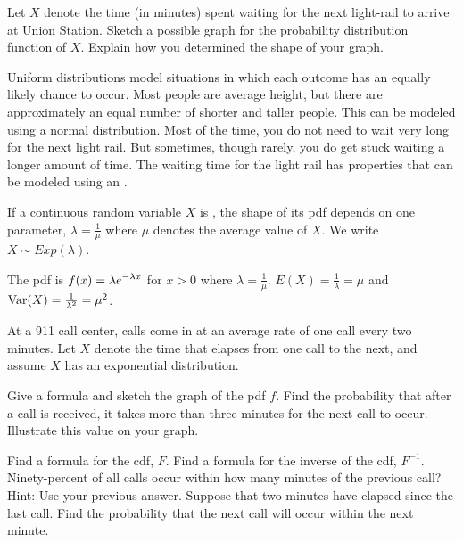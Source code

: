 \bb[resume]
\ii Let $X$ denote the time (in minutes) spent waiting for the next light-rail to arrive at Union Station. Sketch a possible graph for the probability distribution function of $X$. Explain how you determined the shape of your graph. \vfill
\ee

\clearpage



\begin{tcolorbox}
\bi
\ii Uniform distributions model situations in which each outcome has an equally likely chance to occur.
\ii Most people are average height, but there are approximately an equal number of shorter and taller people. This can be modeled using a normal distribution.
\ii Most of the time, you do not need to wait very long for the next light rail. But sometimes, though rarely,  you do get 
stuck waiting a longer amount of time.
\ii The waiting time for the light rail has properties that can be modeled using an \textbf{}.
\ei

If a continuous random variable $X$ is \textbf{}, the shape of its pdf depends on one parameter, $\lambda = \frac{1}{\mu}$ where $\mu$ denotes the average value of $X$. We write $X \sim Exp(\lambda)$.

\bi
\ii The pdf is $\displaystyle f(x) = \lambda e^{-\lambda x}$ for $x >0$ where $\lambda = \frac{1}{\mu}$.
\ii $E(X) = \frac{1}{\lambda}=\mu$ and $\mbox{Var}(X) = \frac{1}{\lambda^2} = \mu^2$.
\ei
\end{tcolorbox}


\bb[resume]
\ii At a 911 call center, calls come in at an average rate of one call every two minutes. Let $X$ denote the time that elapses from one call to the next, and assume $X$ has an exponential distribution.

\bb
\ii Give a formula and sketch the graph of the pdf $f$.  \vfill
\ii Find the probability that after a call is received, it takes more than three minutes for the next call to occur. Illustrate this value on your graph.  \vfill

\clearpage


\ii Find a formula for the cdf, $F$.  \vfill
\ii Find a formula for the inverse of the cdf, $F^{-1}$.  \vfill
\ii Ninety-percent of all calls occur within how many minutes of the previous call? Hint: Use your previous answer.  \vfill
\ii Suppose that two minutes have elapsed since the last call. Find the probability that the next call will occur within the next minute.  \vfill
\ee
\ee



